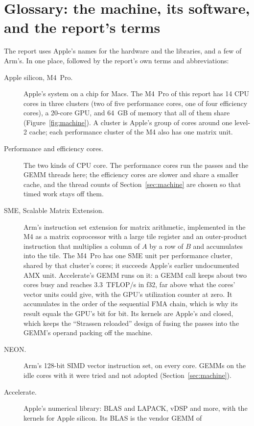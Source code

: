 \documentclass[11pt]{article}
\begin{document}
\section{Glossary: the machine, its software, and the report's terms}\label{sec:glossary}

The report uses Apple's names for the hardware and the libraries, and a few
of Arm's.  In one place, followed by the report's own terms and abbreviations:

\begin{description}
\item[Apple silicon, M4~Pro.]  Apple's system on a chip for Macs.  The M4~Pro
  of this report has 14 CPU cores in three clusters (two of five performance
  cores, one of four efficiency cores), a 20-core GPU, and 64~GB of memory
  that all of them share (Figure~\ref{fig:machine}).  A cluster is Apple's group of
  cores around one level-2 cache; each performance cluster of the M4 also
  has one matrix unit.
\item[Performance and efficiency cores.]  The two kinds of CPU core.  The
  performance cores run the passes and the GEMM threads here; the efficiency
  cores are slower and share a smaller cache, and the thread counts of
  Section~\ref{sec:machine} are chosen so that timed work stays off them.
\item[SME, Scalable Matrix Extension.]  Arm's instruction set extension for
  matrix arithmetic, implemented in the M4 as a matrix coprocessor with a
  large tile register and an outer-product instruction that multiplies a
  column of $A$ by a row of $B$ and accumulates into the tile.  The M4~Pro has
  one SME unit per performance cluster, shared by that cluster's cores; it
  succeeds Apple's earlier undocumented AMX unit.  Accelerate's GEMM runs on
  it: a GEMM call keeps about two cores busy and reaches $3.3$~TFLOP/s in
  f32, far above what the cores' vector units could give, with the GPU's
  utilization counter at zero.  It accumulates in the order of the
  sequential FMA chain, which is why its result equals the GPU's bit for
  bit.  Its kernels are Apple's and closed, which keeps the ``Strassen
  reloaded'' design of fusing the passes into the GEMM's operand packing off
  the machine.
\item[NEON.]  Arm's 128-bit SIMD vector instruction set, on every core.
  GEMMs on the idle cores with it were tried and not adopted
  (Section~\ref{sec:machine}).
\item[Accelerate.]  Apple's numerical library: BLAS and LAPACK, vDSP and
  more, with the kernels for Apple silicon.  Its BLAS is the vendor GEMM of

\end{description}
\end{document}
